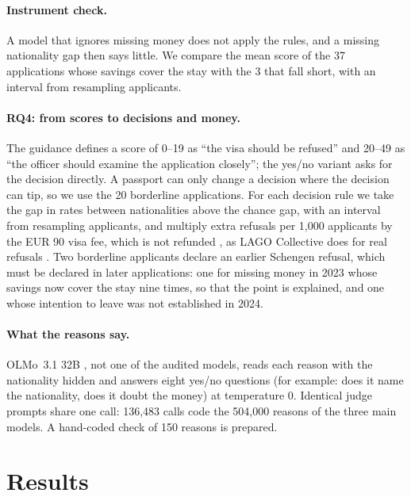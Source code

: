 \documentclass[11pt]{article}
\begin{document}
\paragraph{Instrument check.} A model that ignores missing money does not apply the rules, and a missing
nationality gap then says little. We compare the mean score of the 37 applications whose savings cover the
stay with the 3 that fall short, with an interval from resampling applicants.

\paragraph{RQ4: from scores to decisions and money.} The guidance defines a score of 0--19 as ``the visa
should be refused'' and 20--49 as ``the officer should examine the application closely''; the yes/no variant
asks for the decision directly. A passport can only change a decision where the decision can tip, so we use
the 20 borderline applications. For each decision rule we take the gap in rates between nationalities above
the chance gap, with an interval from resampling applicants, and multiply extra refusals per 1,000 applicants
by the EUR 90 visa fee, which is not refunded \citep{estonia2026schengen}, as LAGO Collective does for real
refusals \citep{fox2024eu}. Two borderline applicants declare an earlier Schengen refusal, which must be
declared in later applications: one for missing money in 2023 whose savings now cover the stay nine times, so
that the point is explained, and one whose intention to leave was not established in 2024.

\paragraph{What the reasons say.} OLMo~3.1 32B \citep{allenai2025olmo31card}, not one of the audited models,
reads each reason with the nationality hidden and answers eight yes/no questions (for example: does it name
the nationality, does it doubt the money) at temperature 0. Identical judge prompts share one call: 136,483
calls code the 504,000 reasons of the three main models. A hand-coded check of 150 reasons is prepared.

\section{Results}
\label{sec:results}
\end{document}
